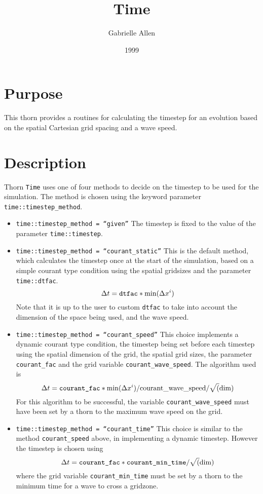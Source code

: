 \documentclass{article}
\begin{document}
\title{Time}
\author{Gabrielle Allen}
\date{1999}
\maketitle


\section{Purpose}

This thorn provides a routines for calculating
the timestep for an evolution based on the spatial Cartesian grid spacing and
a wave speed. 

\section{Description}

Thorn {\tt Time} uses one of four methods to decide on the timestep
to be used for the simulation. The method is chosen using the
keyword parameter {\tt time::timestep\_method}. 

\begin{itemize}

\item{} {\tt time::timestep\_method = ``given''} The timestep is fixed to the
	value of the parameter {\tt time::timestep}. 

\item{} {\tt time::timestep\_method = ``courant\_static''} This is the default
	method, which calculates the timestep once at the start of the
	simulation, based on a simple courant type condition using 
	the spatial gridsizes and the parameter {\tt time::dtfac}.
$$
\Delta t = \mbox{\tt dtfac} * \mbox{min}(\Delta x^i)
$$
	Note that it is up to the user to custom {\tt dtfac} to take
	into account the dimension of the space being used, and the wave speed.

\item{} {\tt time::timestep\_method = ``courant\_speed''} This choice implements a 
	dynamic courant type condition, the timestep being set before each
	timestep using the spatial dimension of the grid, the spatial grid sizes, the 
	parameter {\tt courant\_fac} and the grid variable {\tt courant\_wave\_speed}. 
	The algorithm used is
$$
\Delta t = \mbox{\tt courant\_fac} * \mbox{min}(\Delta x^i)/\mbox{courant\_wave\_speed}/\sqrt(\mbox{dim})
$$
	For this algorithm to be successful, the variable {\tt courant\_wave\_speed}
	must have been set by a thorn to the maximum wave speed on the grid.

\item{} {\tt time::timestep\_method = ``courant\_time''} This choice is similar to the
	method {\tt courant\_speed} above, in implementing a dynamic timestep.
	However the timestep is chosen using
$$
\Delta t = \mbox{\tt courant\_fac} * \mbox{\tt courant\_min\_time}/\sqrt(\mbox{dim})
$$
        where the grid variable {\tt courant\_min\_time} must be set by a thorn to
	the minimum time for a wave to cross a gridzone.

\end{itemize}
\end{document}
